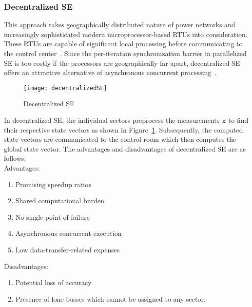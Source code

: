 \documentclass[thesis.tex]{subfiles}
\begin{document}
\subsubsection{Decentralized SE}
This approach takes geographically distributed nature of power networks and increasingly sophisticated modern microprocessor-based RTUs  into consideration. These RTUs are capable of significant local processing before communicating to the control center~\cite{Carvalho}. Since the per-iteration synchronization barrier in parallelized SE is too costly if the processors are geographically far apart, decentralized SE offers an attractive alternative of asynchronous concurrent processing~\cite{Carvalho}.
\begin{figure}[H]
	\centering
	\texttt{[image: decentralizedSE]}
	\caption{Decentralized SE}
	\label{fig:decentralizedSE}
\end{figure}
In decentralized SE, the individual sectors preprocess the measurements $\textbf{\textit{z}}$ to find their respective state vectors as shown in Figure~\ref{fig:decentralizedSE}. Subsequently, the computed state vectors are communicated to the control room which then computes the global state vector.
The advantages and disadvantages of decentralized SE are as follows:\\
Advantages:
\begin{enumerate}
	\item Promising speedup ratios
	\item Shared computational burden
	\item No single point of failure
	\item Asynchronous concurrent execution
	\item Low data-transfer-related expenses
\end{enumerate}

Disadvantages:
\begin{enumerate}
	\item Potential loss of accuracy
	\item Presence of lone busses which cannot be assigned to any sector.
\end{enumerate}
\end{document}
